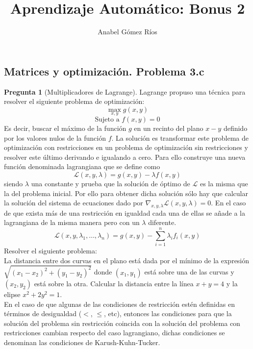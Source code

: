 \documentclass[12pt]{article}
\title{Aprendizaje Automático: Bonus 2}
\author{Anabel G\'omez R\'ios}
\theoremstyle{definition}
\begin{document}
\maketitle

\newtheorem{pregunta}{Pregunta}

\subsection{Matrices y optimización. Problema 3.c}
\begin{pregunta}[Multiplicadores de Lagrange]
Lagrange propuso una técnica para resolver el siguiente problema de optimización:
    \[ \max_{x,y} g(x,y) \]
    \[ \text{Sujeto a } f(x,y)=0 \]
    Es decir, buscar el máximo de la función $g$ en un recinto del plano $x-y$ definido por los valores nulos de la función $f$. La solución es transformar este problema de optimización con restricciones en un problema de optimización sin restricciones y resolver este último derivando e igualando a cero. Para ello construye una nueva función denominada lagrangiana que se define como
    \[
    \mathcal{L}(x,y,\lambda)=g(x,y)-\lambda f(x,y)
    \]
    siendo $\lambda$ una constante y prueba que la solución de óptimo de $\mathcal{L}$ es la misma que la del problema inicial. Por ello para obtener dicha solución sólo hay que calcular la solución del sistema de ecuaciones dado por $\nabla_{x,y,\lambda}\mathcal{L}(x,y,\lambda)=0$. En el caso de que exista más de una restricción en igualdad cada una de ellas se añade a la lagrangiana de la misma manera pero con un $\lambda$ diferente.
    \[
    \mathcal{L}(x,y,\lambda_1,\dots,\lambda_n)=
    			g(x,y)-\sum_{i=1}^n \lambda_i f_i(x,y)
    \]
    Resolver el siguiente problema:\\
    La distancia entre dos curvas en el plano está dada por el mínimo de la expresión $\sqrt{(x_1-x_2)^2+(y_1-y_2)^2}$ donde $(x_1,y_1)$ está sobre una de las curvas y $(x_2,y_2)$ está sobre la otra. Calcular la distancia entre la línea $x+y=4$ y la elipse $x^2+2y^2=1$.\\
    
    En el caso de que algunas de las condiciones de restricción estén definidas en términos de desigualdad ($<$, $ \leq$, etc), entonces las condiciones para que la solución del problema sin restricción coincida con la solución del problema con restricciones cambian respecto del caso lagrangiano, dichas condiciones se denominan las condiciones de \textrm{Karush-Kuhn-Tucker}.\\
\textit{ }\\
    

\end{pregunta}
\end{document}
